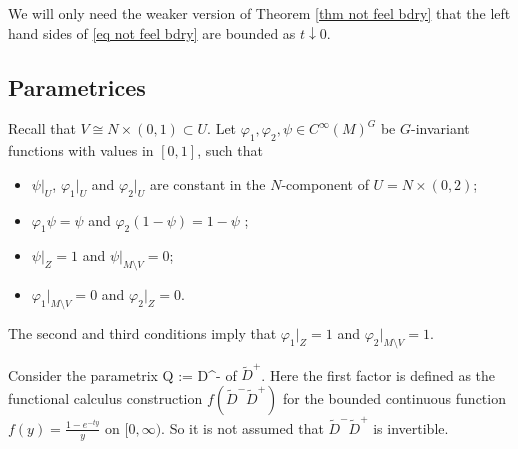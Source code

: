 \documentclass[11pt]{article}
\theoremstyle{plain}
\theoremstyle{definition}
\theoremstyle{remark}
\numberwithin{equation}{section}
\begin{document}
We will only need the weaker version of Theorem \ref{thm not feel bdry} that the left hand sides of \eqref{eq not feel bdry} are bounded as $t \downarrow 0$.

%


\subsection{Parametrices}\label{sec parametrices}




Recall that
$V \cong N \times (0,1) \subset U$.
Let $\varphi_1, \varphi_2, \psi \in C^{\infty}(M)^G$ be $G$-invariant functions with values in $[0,1]$,  such that
\begin{itemize}
\item $\psi|_U$, $\varphi_1|_U$ and $\varphi_2|_U$ are constant in the $N$-component of $U = N \times (0,2)$;
\item $\varphi_1 \psi = \psi$ and $\varphi_2(1- \psi) = 1- \psi$ ;
\item $\psi|_{Z} = 1$ and $\psi|_{M \setminus V} = 0$;
\item $\varphi_1|_{M \setminus V} = 0$ and $\varphi_2|_{Z} = 0$.
\end{itemize}
The second and third conditions imply that $\varphi_1|_{Z} = 1$ and $\varphi_2|_{M \setminus V} = 1$.

Consider the parametrix
\tilde Q :=   \tilde D^-
\eeq
of $\tilde D^+$. Here the first factor is defined as the functional calculus construction $f(\tilde D^- \tilde D^+)$ for the bounded continuous function $f(y) = \frac{1-e^{-ty}}{y}$ on $[0,\infty)$. So it is not assumed that $\tilde D^- \tilde D^+$ is invertible.
\end{document}
